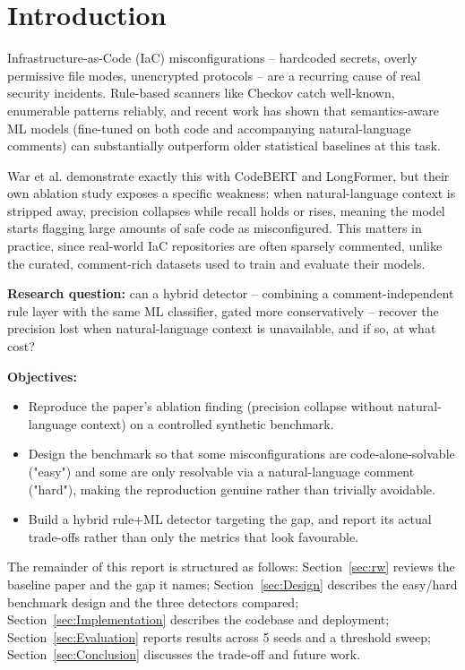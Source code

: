 
\section{Introduction}
\label{sec:Introduction}

Infrastructure-as-Code (IaC) misconfigurations -- hardcoded secrets, overly permissive file modes, unencrypted protocols -- are a recurring cause of real security incidents. Rule-based scanners like Checkov catch well-known, enumerable patterns reliably, and recent work has shown that semantics-aware ML models (fine-tuned on both code and accompanying natural-language comments) can substantially outperform older statistical baselines at this task.

War et al. \cite{War25} demonstrate exactly this with CodeBERT and LongFormer, but their own ablation study exposes a specific weakness: when natural-language context is stripped away, precision collapses while recall holds or rises, meaning the model starts flagging large amounts of safe code as misconfigured. This matters in practice, since real-world IaC repositories are often sparsely commented, unlike the curated, comment-rich datasets used to train and evaluate their models.

\textbf{Research question:} can a hybrid detector -- combining a comment-independent rule layer with the same ML classifier, gated more conservatively -- recover the precision lost when natural-language context is unavailable, and if so, at what cost?

\textbf{Objectives:}
\begin{itemize}
  \item Reproduce the paper's ablation finding (precision collapse without natural-language context) on a controlled synthetic benchmark.
  \item Design the benchmark so that some misconfigurations are code-alone-solvable ("easy") and some are only resolvable via a natural-language comment ("hard"), making the reproduction genuine rather than trivially avoidable.
  \item Build a hybrid rule+ML detector targeting the gap, and report its actual trade-offs rather than only the metrics that look favourable.
\end{itemize}

The remainder of this report is structured as follows: Section~\ref{sec:rw} reviews the baseline paper and the gap it names; Section~\ref{sec:Design} describes the easy/hard benchmark design and the three detectors compared; Section~\ref{sec:Implementation} describes the codebase and deployment; Section~\ref{sec:Evaluation} reports results across 5 seeds and a threshold sweep; Section~\ref{sec:Conclusion} discusses the trade-off and future work.
